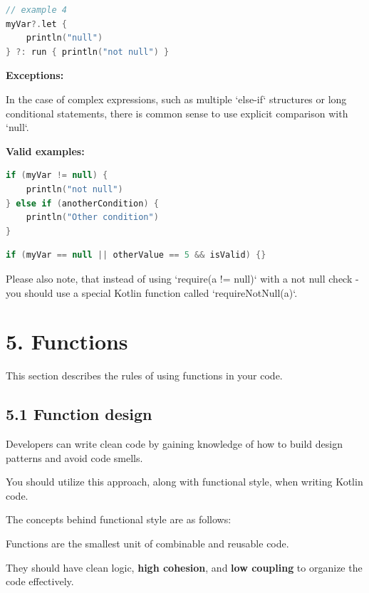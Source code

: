 {{{{\begin{lstlisting}[language=Kotlin]
// example 4
myVar?.let {
    println("null")
} ?: run { println("not null") }
\end{lstlisting}


\textbf{Exceptions:}



In the case of complex expressions, such as multiple `else-if` structures or long conditional statements, there is common sense to use explicit comparison with `null`.



\textbf{Valid examples:}



\begin{lstlisting}[language=Kotlin]
if (myVar != null) {
    println("not null")
} else if (anotherCondition) {
    println("Other condition")
}
\end{lstlisting}


\begin{lstlisting}[language=Kotlin]
if (myVar == null || otherValue == 5 && isValid) {}
\end{lstlisting}


Please also note, that instead of using `require(a != null)` with a not null check - you should use a special Kotlin function called `requireNotNull(a)`.



\section*{\textbf{5. Functions}}

\label{sec:5.}

This section describes the rules of using functions in your code.

\subsection*{\textbf{5.1 Function design}}

\label{sec:5.1}

Developers can write clean code by gaining knowledge of how to build design patterns and avoid code smells.

You should utilize this approach, along with functional style, when writing Kotlin code. 

The concepts behind functional style are as follows: 

Functions are the smallest unit of combinable and reusable code.

They should have clean logic, \textbf{high cohesion}, and \textbf{low coupling} to organize the code effectively.

}}}}
